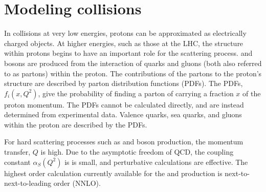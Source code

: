 \section{Modeling \pp collisions}
In collisions at very low energies, protons can be approximated as electrically charged objects. At higher energies, such as those at the LHC, the structure within protons begins to have an important role for the scattering process. \W and \Z bosons are produced from the interaction of quarks and gluons (both also referred to as partons) within the proton\cite{PhysRevLett.23.930,PhysRevLett.23.935}. The contributions of the partons to the proton's structure are described by parton distribution functions (PDFs). The PDFs, $f_i(x,Q^2)$, give the probability of finding a parton of carrying a fraction $x$ of the proton momentum. The PDFs cannot be calculated directly, and are instead determined from experimental data. Valence quarks, sea quarks, and gluons within the proton are described by the PDFs. 

For hard scattering processes such as \W and \Z boson production, the momentum transfer, $Q$ is high. Due to the asymptotic freedom of QCD, the coupling constant $\alpha_S(Q^2)$ is is small, and perturbative calculations are effective. The highest order calculation currently available for the \W and \Z production is next-to-next-to-leading order (NNLO)\cite{Anastasiou:2003ds}. 

